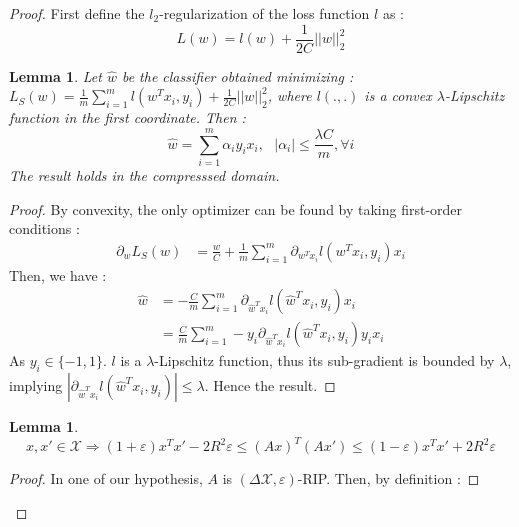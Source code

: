 \documentclass{article}
\newtheorem{lemma}[theorem]{Lemma}
\begin{document}
\begin{proof}
    First define the $l_2$-regularization of the loss function $l$ as :
    \[L(w) = l(w) + \frac{1}{2C}||w||_2^2\]
    \begin{lemma} \label{lemma1}
        Let $\hat{w}$ be the classifier obtained minimizing :
        $L_S(w) = \frac{1}{m} \sum_{i=1}^m l(w^Tx_i, y_i) + \frac{1}{2C}||w||_2^2 $,
        where $l(., .)$ is a convex $\lambda$-Lipschitz function in the first coordinate. 
        Then :
        \[\hat{w} = \sum_{i=1}^m \alpha_i y_i x_i , \ \ \
        |\alpha_i|\leq \frac{\lambda C}{m}, \forall i\]
        The result holds in the compresssed domain.
    \end{lemma}
    \begin{proof}
         By convexity, the only optimizer can be found
        by taking first-order conditions :
        \begin{align*}
            \partial_w L_S(w) &= 
                    \frac{w}{C} + \frac{1}{m} \sum_{i=1}^m \partial_{w^Tx_i} l(w^T x_i, y_i)x_i
        \end{align*}
        Then, we have :
        \begin{align*}
            \hat{w} &=- \frac{C}{m} \sum_{i=1}^m \partial_{\hat{w}^Tx_i} l(\hat{w}^T x_i, y_i)x_i \\
                    &= \frac{C}{m} \sum_{i=1}^m - y_i\partial_{\hat{w}^Tx_i} l(\hat{w}^T x_i, y_i) y_i x_i
        \end{align*}
        As $y_i\in \{-1, 1\}$. 
        $l$ is a $\lambda$-Lipschitz function, thus its sub-gradient 
        is bounded by $\lambda$, implying $|\partial_{\hat{w}^Tx_i} l(\hat{w}^T x_i, y_i)| \leq \lambda$. 
        Hence the result.
    \end{proof}
    \begin{lemma}\label{lemma2}
        \[ x, x' \in \mathcal{X} 
        \Rightarrow 
        (1+\varepsilon) x^Tx' - 2R^2 \varepsilon 
        \leq (Ax)^T (Ax') 
        \leq (1-\varepsilon) x^Tx' + 2R^2 \varepsilon 
        \]
    \end{lemma}
    \begin{proof}
        In one of our hypothesis, $A$ is $(\Delta \mathcal{X}, \varepsilon)$-RIP. 
        Then, by definition : 


\end{proof}
\end{proof}
\end{document}
